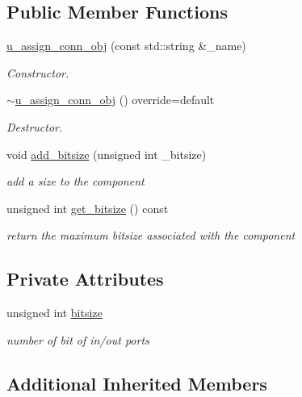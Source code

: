 \subsection*{Public Member Functions}
\begin{DoxyCompactItemize}
\item 
\hyperlink{classu__assign__conn__obj_a4e2dfec62f384099aecd24d323c3bb04}{u\+\_\+assign\+\_\+conn\+\_\+obj} (const std\+::string \&\+\_\+name)
\begin{DoxyCompactList}\small\item\em Constructor. \end{DoxyCompactList}\item 
\hyperlink{classu__assign__conn__obj_a6a204b1f4b3a6db41b8d0c70e1762827}{$\sim$u\+\_\+assign\+\_\+conn\+\_\+obj} () override=default
\begin{DoxyCompactList}\small\item\em Destructor. \end{DoxyCompactList}\item 
void \hyperlink{classu__assign__conn__obj_a2a96325e12d7b2ce296b7fd4ee6dfea3}{add\+\_\+bitsize} (unsigned int \+\_\+bitsize)
\begin{DoxyCompactList}\small\item\em add a size to the component \end{DoxyCompactList}\item 
unsigned int \hyperlink{classu__assign__conn__obj_a4039600989d2c814004ebc6114f855ea}{get\+\_\+bitsize} () const
\begin{DoxyCompactList}\small\item\em return the maximum bitsize associated with the component \end{DoxyCompactList}\end{DoxyCompactItemize}
\subsection*{Private Attributes}
\begin{DoxyCompactItemize}
\item 
unsigned int \hyperlink{classu__assign__conn__obj_a8c73ef69b57d4feacbe4360b313e3352}{bitsize}
\begin{DoxyCompactList}\small\item\em number of bit of in/out ports \end{DoxyCompactList}\end{DoxyCompactItemize}
\subsection*{Additional Inherited Members}


